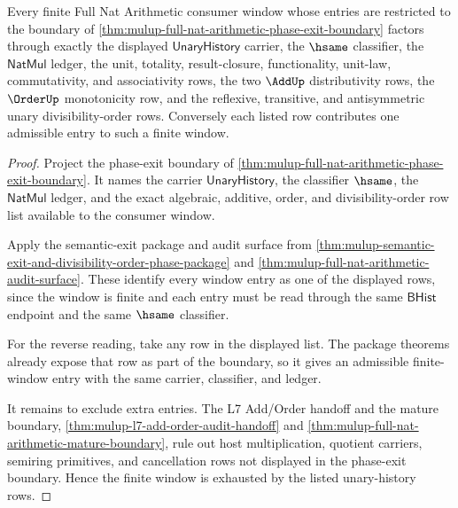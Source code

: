 \begin{theorem}
\label{thm:mulup-full-nat-arithmetic-window-exhaustion}
Every finite Full Nat Arithmetic consumer window whose entries are restricted
to the boundary of
\autoref{thm:mulup-full-nat-arithmetic-phase-exit-boundary} factors through
exactly the displayed $\mathsf{UnaryHistory}$ carrier, the $\hsame$
classifier, the $\mathsf{NatMul}$ ledger, the unit, totality, result-closure,
functionality, unit-law, commutativity, and associativity rows, the two
$\AddUp$ distributivity rows, the $\OrderUp$ monotonicity row, and the
reflexive, transitive, and antisymmetric unary divisibility-order rows.
Conversely each listed row contributes one admissible entry to such a finite
window.
\end{theorem}
\begin{proof}
Project the phase-exit boundary of
\autoref{thm:mulup-full-nat-arithmetic-phase-exit-boundary}. It names the
carrier $\mathsf{UnaryHistory}$, the classifier $\hsame$, the
$\mathsf{NatMul}$ ledger, and the exact algebraic, additive, order, and
divisibility-order row list available to the consumer window.

Apply the semantic-exit package and audit surface from
\autoref{thm:mulup-semantic-exit-and-divisibility-order-phase-package} and
\autoref{thm:mulup-full-nat-arithmetic-audit-surface}. These identify every
window entry as one of the displayed rows, since the window is finite and each
entry must be read through the same $\mathsf{BHist}$ endpoint and the same
$\hsame$ classifier.

For the reverse reading, take any row in the displayed list. The package
theorems already expose that row as part of the boundary, so it gives an
admissible finite-window entry with the same carrier, classifier, and ledger.

It remains to exclude extra entries. The L7 Add/Order handoff and the mature
boundary,
\autoref{thm:mulup-l7-add-order-audit-handoff} and
\autoref{thm:mulup-full-nat-arithmetic-mature-boundary}, rule out host
multiplication, quotient carriers, semiring primitives, and cancellation rows
not displayed in the phase-exit boundary. Hence the finite window is exhausted
by the listed unary-history rows.
\end{proof}

